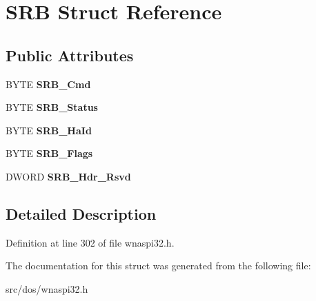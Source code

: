 \hypertarget{structSRB}{\section{S\-R\-B Struct Reference}
\label{structSRB}
}
\subsection*{Public Attributes}
\begin{DoxyCompactItemize}
\item 
\hypertarget{structSRB_aa5e6250cefd1502a007f880571cf2864}{B\-Y\-T\-E {\bfseries S\-R\-B\-\_\-\-Cmd}}\label{structSRB_aa5e6250cefd1502a007f880571cf2864}

\item 
\hypertarget{structSRB_abbec3e23bb3a9c3412568b0685d6b905}{B\-Y\-T\-E {\bfseries S\-R\-B\-\_\-\-Status}}\label{structSRB_abbec3e23bb3a9c3412568b0685d6b905}

\item 
\hypertarget{structSRB_a4c36cb455dfc63138893eb3829d1b05e}{B\-Y\-T\-E {\bfseries S\-R\-B\-\_\-\-Ha\-Id}}\label{structSRB_a4c36cb455dfc63138893eb3829d1b05e}

\item 
\hypertarget{structSRB_aa54dce5432771541bccca41b1c1915f8}{B\-Y\-T\-E {\bfseries S\-R\-B\-\_\-\-Flags}}\label{structSRB_aa54dce5432771541bccca41b1c1915f8}

\item 
\hypertarget{structSRB_a5faab7fe74283e92923a1ce4f954b43e}{D\-W\-O\-R\-D {\bfseries S\-R\-B\-\_\-\-Hdr\-\_\-\-Rsvd}}\label{structSRB_a5faab7fe74283e92923a1ce4f954b43e}

\end{DoxyCompactItemize}


\subsection{Detailed Description}


Definition at line 302 of file wnaspi32.\-h.



The documentation for this struct was generated from the following file\-:\begin{DoxyCompactItemize}
\item 
src/dos/wnaspi32.\-h\end{DoxyCompactItemize}
